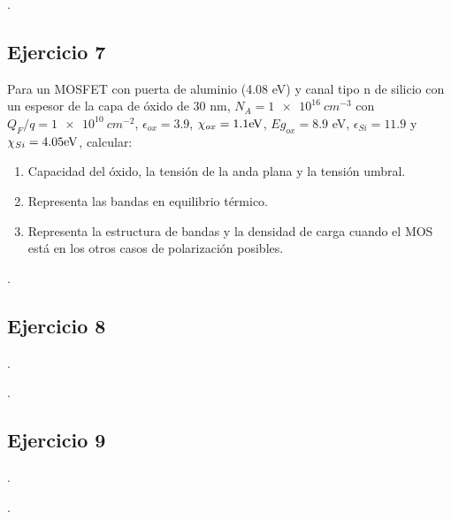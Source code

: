\vspace*{1em}

\lipsum[1].

\vspace*{2em}

\begin{Enunciado}
	\subsection*{Ejercicio 7}
	Para un MOSFET con puerta de aluminio (4.08 eV) y canal tipo n de silicio con un espesor de la capa de óxido de 30 nm, $N_A = \SI{1e16}{cm^{-3}}$ con $Q_F/q=\SI{1e10}{cm^{-2}}$, $\epsilon_{ox}=3.9$, $\chi_{ox}=1.1 \text{eV}$, $Eg_{ox}=8.9$ eV, $\epsilon_{Si} = 11.9$ y $\chi_{Si}=4.05 \text{eV}$, calcular:
	\begin{enumerate}[label=\alph*)]
		\item Capacidad del óxido, la tensión de la anda plana y la tensión umbral.
		\item Representa las bandas en equilibrio térmico.
		\item Representa la estructura de bandas y la densidad de carga cuando el MOS está en los otros casos de polarización posibles. 
	\end{enumerate}
\end{Enunciado}
\vspace*{1em}
\lipsum[1].
\vspace*{2em}

\begin{Enunciado}
	\subsection*{Ejercicio 8}
    
	\lipsum[1].
\end{Enunciado}
\vspace*{1em}
\lipsum[1].
\vspace*{2em}
\begin{Enunciado}
	\subsection*{Ejercicio 9}
    
	\lipsum[1].
\end{Enunciado}
\vspace*{1em}
\lipsum[1].


